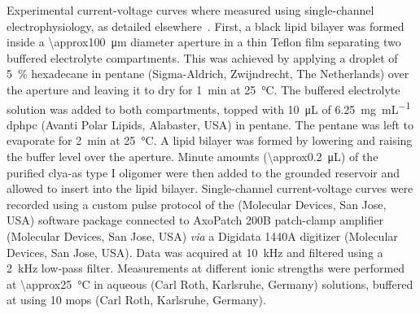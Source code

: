 Experimental current-voltage curves where measured using single-channel electrophysiology, as detailed
elsewhere~\cite{Maglia-2010,Soskine-2012,Soskine-2013}. First, a black lipid bilayer was formed inside a
\SI{\approx100}{\um} diameter aperture in a thin Teflon film separating two buffered electrolyte compartments.
This was achieved by applying a droplet of \SI{5}{\percent} hexadecane in pentane (Sigma-Aldrich, Zwijndrecht,
The Netherlands) over the aperture and leaving it to dry for \SI{1}{\minute} at \SI{25}{\celsius}. The
buffered electrolyte solution was added to both compartments, topped with \SI{10}{\uL} of
\SI{6.25}{\milli\gram\per\milli\liter} \gls{dphpc} (Avanti Polar Lipids, Alabaster, USA) in pentane. The
pentane was left to evaporate for \SI{2}{\minute} at \SI{25}{\celsius}. A lipid bilayer was formed by lowering
and raising the buffer level over the aperture. Minute amounts (\SI{\approx0.2}{\uL}) of the purified
\gls{clya-as} {type I} oligomer were then added to the grounded \cisi{} reservoir and allowed to insert into
the lipid bilayer. Single-channel current-voltage curves were recorded using a custom pulse protocol of the
 (Molecular Devices, San Jose, USA) software package connected to AxoPatch 200B patch-clamp
amplifier (Molecular Devices, San Jose, USA) \textit{via} a Digidata 1440A digitizer (Molecular Devices, San
Jose, USA). Data was acquired at \SI{10}{\kHz} and filtered using a \SI{2}{\kHz} low-pass filter. Measurements
at different ionic strengths were performed at \SI{\approx25}{\celsius} in aqueous  (Carl Roth,
Karlsruhe, Germany) solutions, buffered at  using \SI{10}{\mM} \gls{mops} (Carl Roth, Karlsruhe,
Germany).


\cleardoublepage

